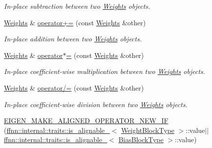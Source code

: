 \begin{DoxyCompactItemize}
\begin{DoxyCompactList}\small\item\em In-\/place subtraction between two \hyperlink{classffnn_1_1layer_1_1fully__connected_1_1_weights}{Weights} objects. \end{DoxyCompactList}\item 
\hyperlink{classffnn_1_1layer_1_1fully__connected_1_1_weights}{Weights} \& \hyperlink{classffnn_1_1layer_1_1fully__connected_1_1_weights_a00cf9205826d87af40fb6b9975414620}{operator+=} (const \hyperlink{classffnn_1_1layer_1_1fully__connected_1_1_weights}{Weights} \&other)
\begin{DoxyCompactList}\small\item\em In-\/place addition between two \hyperlink{classffnn_1_1layer_1_1fully__connected_1_1_weights}{Weights} objects. \end{DoxyCompactList}\item 
\hyperlink{classffnn_1_1layer_1_1fully__connected_1_1_weights}{Weights} \& \hyperlink{classffnn_1_1layer_1_1fully__connected_1_1_weights_a03b0a9d4f05ce1f5e5d521176590bab1}{operator$\ast$=} (const \hyperlink{classffnn_1_1layer_1_1fully__connected_1_1_weights}{Weights} \&other)
\begin{DoxyCompactList}\small\item\em In-\/place coefficient-\/wise multiplication between two \hyperlink{classffnn_1_1layer_1_1fully__connected_1_1_weights}{Weights} objects. \end{DoxyCompactList}\item 
\hyperlink{classffnn_1_1layer_1_1fully__connected_1_1_weights}{Weights} \& \hyperlink{classffnn_1_1layer_1_1fully__connected_1_1_weights_add32128aeadacb037e767f2127523848}{operator/=} (const \hyperlink{classffnn_1_1layer_1_1fully__connected_1_1_weights}{Weights} \&other)
\begin{DoxyCompactList}\small\item\em In-\/place coefficient-\/wise division between two \hyperlink{classffnn_1_1layer_1_1fully__connected_1_1_weights}{Weights} objects. \end{DoxyCompactList}\item 
\hyperlink{classffnn_1_1layer_1_1fully__connected_1_1_weights_a2924043c88c2c37a8607d8b4aee7e457}{E\-I\-G\-E\-N\-\_\-\-M\-A\-K\-E\-\_\-\-A\-L\-I\-G\-N\-E\-D\-\_\-\-O\-P\-E\-R\-A\-T\-O\-R\-\_\-\-N\-E\-W\-\_\-\-I\-F} (\hyperlink{structffnn_1_1internal_1_1traits_1_1is__alignable__128}{ffnn\-::internal\-::traits\-::is\-\_\-alignable\-\_}$<$ \hyperlink{classffnn_1_1layer_1_1fully__connected_1_1_weights_a60cdcf8a80260e8558f1e64f8a0a8218}{Weight\-Block\-Type} $>$\-::value$\vert$$\vert$\hyperlink{structffnn_1_1internal_1_1traits_1_1is__alignable__128}{ffnn\-::internal\-::traits\-::is\-\_\-alignable\-\_}$<$ \hyperlink{classffnn_1_1layer_1_1fully__connected_1_1_weights_a6f5ad97bf46dac9d55752b5117768957}{Bias\-Block\-Type} $>$\-::value)
\end{DoxyCompactItemize}
